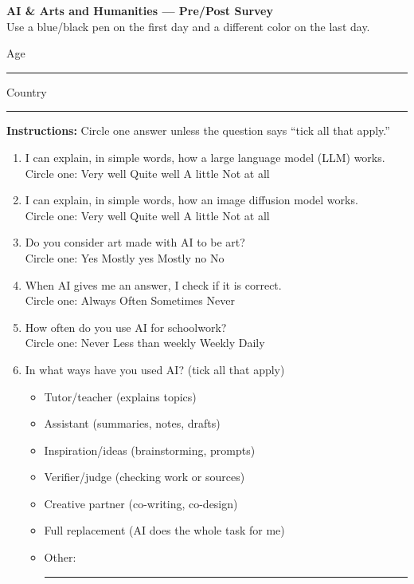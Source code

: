 \documentclass[11pt]{article}
\begin{document}
\pagestyle{empty}

\begin{center}
\Large\textbf{AI \& Arts and Humanities — Pre/Post Survey} \\ [0.5em]
\small Use a blue/black pen on the first day and a different color on the last day.
\end{center}


\noindent Age \rule{0.15\linewidth}{0.4pt} \hfill Country \rule{0.3\linewidth}{0.4pt}


\bigskip


\textbf{Instructions:} Circle one answer unless the question says ``tick all that apply.''


\bigskip


\begin{enumerate}
\item I can explain, in simple words, how a large language model (LLM) works.\\
Circle one: \quad Very well \quad Quite well \quad A little \quad Not at all


\item I can explain, in simple words, how an image diffusion model works.\\
Circle one: \quad Very well \quad Quite well \quad A little \quad Not at all

\item Do you consider art made with AI to be art?\\
Circle one: \quad Yes \quad Mostly yes \quad Mostly no \quad No

\item When AI gives me an answer, I check if it is correct.\\
Circle one: \quad Always \quad Often \quad Sometimes \quad Never

\item How often do you use AI for schoolwork?\\
Circle one: \quad Never \quad Less than weekly \quad Weekly \quad Daily

\item In what ways have you used AI? (tick all that apply)
\begin{itemize}[label=$\square$, leftmargin=2em]
\item Tutor/teacher (explains topics)
\item Assistant (summaries, notes, drafts)
\item Inspiration/ideas (brainstorming, prompts)
\item Verifier/judge (checking work or sources)
\item Creative partner (co-writing, co-design)
\item Full replacement (AI does the whole task for me)
\item Other: \rule{0.55\linewidth}{0.4pt}
\end{itemize}


\end{enumerate}
\end{document}
